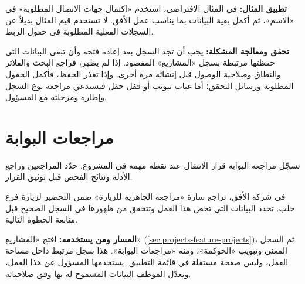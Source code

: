 \textbf{تطبيق المثال:} في المثال الافتراضي، استخدم «اكتمال جهات الاتصال المطلوبة» في «الاسم»، ثم أكمل بقية البيانات بما يناسب عمل الأفق. لا تستخدم قيم المثال بديلاً عن السجلات الفعلية المطلوبة في حقول الربط.

\textbf{تحقق ومعالجة المشكلة:} يجب أن تجد السجل بعد إعادة فتحه وأن تبقى البيانات التي حفظتها مرتبطة بسجل «المشاريع» المقصود. إذا لم يظهر، فراجع البحث والفلاتر والنطاق وصلاحية الوصول قبل إنشائه مرة أخرى. وإذا تعذر الحفظ، فأكمل الحقول المطلوبة ورسائل التحقق؛ أما غياب تبويب أو قفل حقل فيستدعي مراجعة نوع السجل وإطاره ومرحلته مع المسؤول.

\clearpage
\section{مراجعات البوابة}
\label{sec:projects-feature-gate-reviews}

تسجّل مراجعة البوابة قرار الانتقال عند نقطة مهمة في المشروع. حدّد المراجعين وراجع الأدلة ونتائج الفحص قبل توثيق القرار.

\begin{rcnote}
في شركة الأفق، تراجع سارة «مراجعة الجاهزية للزيارة» ضمن التحضير لزيارة فرع حلب. تحدد البيانات التي تخص هذا العمل وتتحقق من ظهورها في السجل الصحيح قبل متابعة الخطوة التالية.
\end{rcnote}

\textbf{المسار ومن يستخدمه:} افتح «المشاريع» (\ref{sec:projects-feature-projects})، ثم السجل المعني وتبويب «الحوكمة»، ومنه «مراجعات البوابة». هذا سجل مرتبط داخل مساحة العمل، وليس صفحة مستقلة في قائمة التطبيق. يستخدمها المسؤول عن هذا العمل، ويعدّل الموظف البيانات المسموح له بها وفق صلاحياته.

